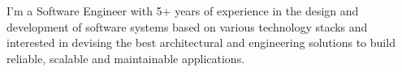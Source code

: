 

\begin{cvparagraph}

I'm a Software Engineer with 5+ years of experience in the design and development of software systems based on various technology stacks and interested in devising the best architectural and engineering solutions to build reliable, scalable and maintainable applications.

\end{cvparagraph}
